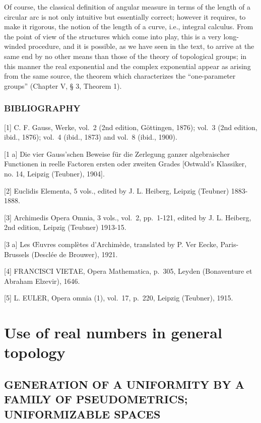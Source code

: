 Of course, the classical definition of angular measure in terms of the length of a circular arc is not only intuitive but essentially correct; however it requires, to make it rigorous, the notion of the length of a curve, i.e., integral calculus. From the point of view of the structures which come into play, this is a very long-winded procedure, and it is possible, as we have seen in the text, to arrive at the same end by no other means than those of the theory of topological groups; in this manner the real exponential and the complex exponential appear as arising from the same source, the theorem which characterizes the ``one-parameter groups'' (Chapter V, § 3, Theorem 1).

\subsection*{BIBLIOGRAPHY}

{[}1{]} C. F. Gauss, Werke, vol.~2 (2nd edition, Göttingen, 1876); vol.~3 (2nd edition, ibid., 1876); vol.~4 (ibid., 1873) and vol.~8 (ibid., 1900).

{[}1 a{]} Die vier Gauss'schen Beweise für die Zerlegung ganzer algebraischer Functionen in reelle Factoren ersten oder zweiten Grades {[}Ostwald's Klassiker, no. 14, Leipzig (Teubner), 1904{]}.

{[}2{]} Euclidis Elementa, 5 vols., edited by J. L. Heiberg, Leipzig (Teubner) 1883-1888.

{[}3{]} Archimedis Opera Omnia, 3 vols., vol.~2, pp.~1-121, edited by J. L. Heiberg, 2nd edition, Leipzig (Teubner) 1913-15.

{[}3 a{]} Les Œuvres complètes d'Archimède, translated by P. Ver Eecke, Paris-Brussels (Desclée de Brouwer), 1921.

{[}4{]} FRANCISCI VIETAE, Opera Mathematica, p.~305, Leyden (Bonaventure et Abraham Elzevir), 1646.

{[}5{]} L. EULER, Opera omnia (1), vol.~17, p.~220, Leipzig (Teubner), 1915.

\chapter{Use of real numbers in general topology}

\section{GENERATION OF A UNIFORMITY BY A FAMILY OF PSEUDOMETRICS; UNIFORMIZABLE SPACES}

